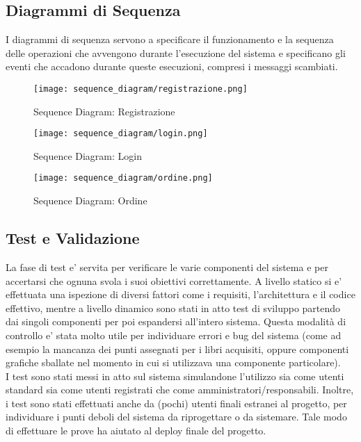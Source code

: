 \documentclass[a4paper, 10pt]{article}
\begin{document}
	\subsection{Diagrammi di Sequenza}
	I diagrammi di sequenza servono a specificare il funzionamento e la sequenza 
	delle operazioni che avvengono durante l'esecuzione del sistema e specificano 
	gli eventi che accadono durante queste esecuzioni, compresi i messaggi scambiati. 
	\begin{figure}[h]
				\centering
				\texttt{[image: sequence\_diagram/registrazione.png]}
				\caption{Sequence Diagram: Registrazione}
	\end{figure}
	\begin{figure}[h]
				\centering
				\texttt{[image: sequence\_diagram/login.png]}
				\caption{Sequence Diagram: Login}
	\end{figure}
	\begin{figure}[h]
				\centering
				\texttt{[image: sequence\_diagram/ordine.png]}
				\caption{Sequence Diagram: Ordine}
	\end{figure}\clearpage
	\newpage
	\subsection{Test e Validazione}
	La fase di test e' servita per verificare le varie componenti del sistema 
	e per accertarsi che ognuna svola i suoi obiettivi correttamente. A livello statico si e' effettuata    
	una ispezione di diversi fattori come i requisiti, l'architettura e il codice effettivo, 
	mentre a livello dinamico sono stati in atto test di sviluppo partendo dai singoli 
	componenti per poi espandersi all'intero sistema. Questa modalità di controllo e' 
	stata molto utile per individuare errori e bug del sistema (come ad esempio la 
	mancanza dei punti assegnati per i libri acquisiti, oppure componenti grafiche 
	sballate nel momento in cui si utilizzava una componente particolare). 
	\\ I test sono stati messi in atto sul sistema simulandone l'utilizzo 
	sia come utenti standard sia come utenti registrati che come 
	amministratori/responsabili. Inoltre, i test sono stati effettuati 
	anche da (pochi) utenti finali estranei al progetto, per individuare 
	i punti deboli del sistema da riprogettare o da sistemare. Tale modo 
	di effettuare le prove ha aiutato al deploy finale del progetto.
\end{document}
